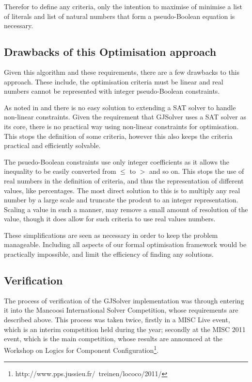 Therefor to define any criteria, only the intention to maximise of minimise a list of literals and list of natural numbers that form a pseudo-Boolean equation is necessary. 

\subsection{Drawbacks of this Optimisation approach}
Given this algorithm and these requirements, there are a few drawbacks to this approach.
These include, the optimisation criteria must be linear and real numbers cannot be represented with integer pseudo-Boolean constraints.

As noted in \cite{le_berre_dependency_2009} and \cite{leBerre2010} there is no easy solution to extending a SAT solver to handle non-linear constraints.
Given the requirement that GJSolver uses a SAT solver as its core, there is no practical way using non-linear constraints for optimisation.
This stops the definition of some criteria, however this also keeps the criteria practical and efficiently solvable.   

The psuedo-Boolean constraints use only integer coefficients as it allows the inequality to be easily converted from $\leq$ to $>$ and so on.
This stops the use of real numbers in the definition of criteria, and thus the representation of different values, like percentages.
The most direct solution to this is to multiply any real number by a large scale and truncate the prodcut to an integer representation.
Scaling a value in such a manner, may remove a small amount of resolution of the value, though it does allow for such criteria to use real values numbers.

These simplifications are seen as necessary in order to keep the problem manageable.
Including all aspects of our formal optimisation framework would be practically impossible, and limit the efficiency of finding any solutions.

\subsection{Verification}
The process of verification of the GJSolver implementation was through entering it into the Mancoosi International Solver Competition, whose requirements are described above.
This process was taken twice, firstly in a MISC Live event, which is an interim competition held during the year;
secondly at the MISC 2011 event, 
which is the main competition, whose results are announced at the Workshop on Logics for Component Configuration\footnote{http://www.pps.jussieu.fr/~treinen/lococo/2011/}.


